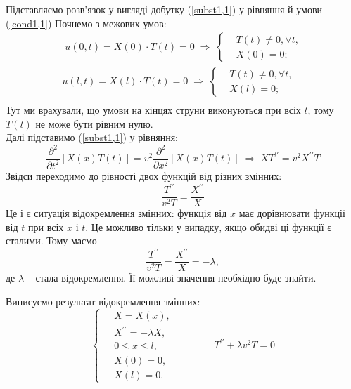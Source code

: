 Підставляємо розв'язок у вигляді добутку (\ref{subst1,1})  у рівняння й умови (\ref{cond1,1}) Почнемо з межових умов:
\begin{equation*}
    \begin{aligned}
        \;u(0,t) = X(0) \cdot T(t) = 0
        \;\Rightarrow\;
        \left\{ \begin{aligned}
            &T(t) \neq 0, \forall t, \\  &X(0) = 0; 
        \end{aligned} \right.\\
        u(l,t) = X(l) \cdot T(t) = 0
        \;\Rightarrow\;
        \left\{ \begin{aligned}
            &T(t) \neq 0, \forall t, \\  &X(l) = 0; 
        \end{aligned} \right.\\
    \end{aligned}
\end{equation*}
Тут ми врахували, що умови на кінцях струни виконуються при всіх $t$, тому $T(t)$ не може бути рівним нулю.\\
Далі підставимо (\ref{subst1,1}) у рівняння:
\begin{equation*}
    \frac{\partial^2}{\partial t^2}\left[X(x)T(t)\right] = v^2 \frac{\partial^2}{\partial x^2}\left[X(x)T(t)\right]
    \;\Rightarrow\; 
    X T^{\prime\prime} = v^2 X^{\prime\prime} T 
\end{equation*}
Звідси переходимо до рівності двох функцій від різних змінних:
\begin{equation}
    \frac{T^{\prime\prime}}{v^2T} = \frac{X^{\prime\prime}}{X}
\end{equation}
Це і є ситуація відокремлення змінних: функція від $x$ має дорівнювати функції від $t$ при всіх $x$ і $t$. Це можливо тільки у випадку, якщо обидві ці функції є сталими. Тому маємо
\begin{equation}
    \frac{T^{\prime\prime}}{v^2T} = \frac{X^{\prime\prime}}{X} = - \lambda,
\end{equation}
де $\lambda$ -- стала відокремлення. Її можливі значення необхідно буде знайти.

Виписуємо результат відокремлення змінних:
\begin{equation} \label{sepvar1,1}
    \left\{ \begin{aligned}
        \;&X = X(x), \\  &X^{\prime\prime} = -\lambda X, \\ &0 \leq x \leq l, \\  &X(0) = 0, \\ &X(l) = 0. 
    \end{aligned} \right.
    \qquad\qquad
    T^{\prime\prime} + \lambda v^2 T = 0
\end{equation}

